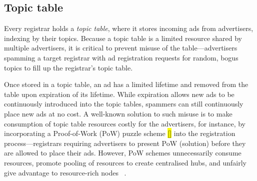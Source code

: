 \subsection{Topic table}
Every registrar holds a \emph{topic table}, where it stores incoming ads from advertisers, indexing by their topics. Because a topic table is a limited resource shared by multiple advertisers, it is critical to prevent misuse of the table---\eg advertisers spamming a target registrar with ad registration requests for random, bogus topics to fill up the registrar's topic table. %

Once stored in a topic table, an ad has a limited lifetime and removed from the table upon expiration of its lifetime. While expiration allows new ads to be continuously introduced into the topic tables, spammers can still continuously place new ads at no cost. A well-known solution to such misuse is to make consumption of topic table resources costly for the advertisers, for instance, by incorporating a Proof-of-Work (PoW) puzzle scheme \hl{[]} into the registration process---\eg registrars requiring advertisers to present PoW (\ie solution) before they are allowed to place their ads. However, PoW schemes unnecessarily consume resources, promote pooling of resources to create centralised hubs, and unfairly give advantage to resource-rich nodes ~\cite{gervais2014bitcoin}. 




